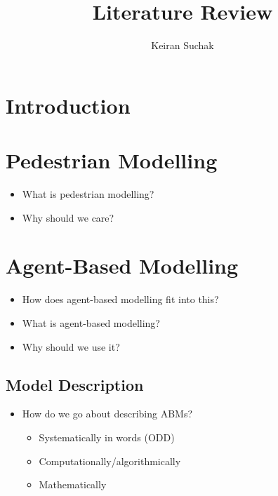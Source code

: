 \documentclass[11pt,a4paper]{article}
\begin{document}
\title{Literature Review}
\author{Keiran Suchak}

\maketitle
\tableofcontents

\newpage

\section{Introduction}
\label{sec:intro}

\section{Pedestrian Modelling}
\label{sec:pedestrians}

\begin{itemize}
    \item What is pedestrian modelling?
    \item Why should we care?
\end{itemize}

\section{Agent-Based Modelling}
\label{sec:abms}

\begin{itemize}

    \item How does agent-based modelling fit into this?
    \item What is agent-based modelling?
    \item Why should we use it?
\end{itemize}

\subsection{Model Description}
\label{sub:abms:description}

\begin{itemize}
    \item How do we go about describing ABMs?
        \begin{itemize}
            \item Systematically in words (ODD) \citep{grimm2006standard}
            \item Computationally/algorithmically \citep{north2014theoretical}
            \item Mathematically
                \citep{hinkelmann2011mathematical,hinkelmann2011adam}
        \end{itemize}
\end{itemize}
\end{document}
